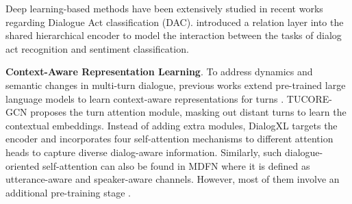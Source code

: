 Deep learning-based methods have been extensively studied in recent works \citep{lee-dernoncourt-2016-sequential, chen2018dialogue, raheja2019dialogue} regarding Dialogue Act classification (DAC). \cite{chen2018dialogue} introduced a relation layer into the shared hierarchical encoder to model the interaction between the tasks of dialog act recognition and sentiment classification.


\textbf{Context-Aware Representation Learning}. To address dynamics and semantic changes in multi-turn dialogue, previous works extend pre-trained large language models to learn context-aware representations for turns \citep{lee2021graph, DialogXL, DCM, chapuis2020hierarchical}. TUCORE-GCN \citep{lee2021graph} proposes the turn attention module, masking out distant turns to learn the contextual embeddings. Instead of adding extra modules, DialogXL \citep{DialogXL} targets the encoder and incorporates four self-attention mechanisms to different attention heads to capture diverse dialog-aware information. Similarly, such dialogue-oriented self-attention can also be found in MDFN \citep{MDFN} where it is defined as utterance-aware and speaker-aware channels. However, most of them involve an additional pre-training stage \citep{DialogXL, DCM, chapuis2020hierarchical}. 

